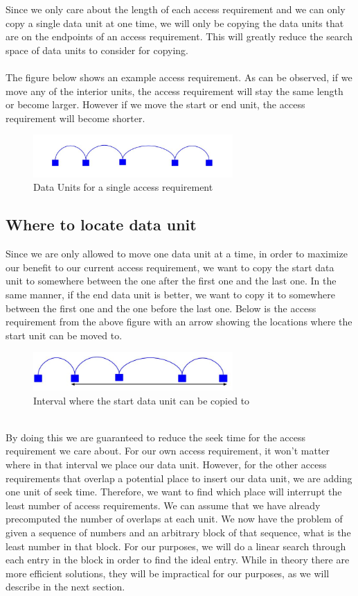 \documentclass[conference]{acmsiggraph}
\begin{document}
Since we only care about the length of each access requirement and we can only copy a single data unit at one time, we will only be copying the data units that are on the endpoints of an access requirement. This will greatly reduce the search space of data units to consider for copying. \\
\\
The figure below shows an example access requirement. As can be observed, if we move any of the interior units, the access requirement will stay the same length or become larger. However if we move the start or end unit, the access requirement will become shorter. 
\begin{figure}[ht]
\centering
\includegraphics[width=3in]{SingleAR_start.jpg}
\caption{Data Units for a single access requirement}
\end{figure}

\subsection{Where to locate data unit}

Since we are only allowed to move one data unit at a time, in order to maximize our benefit to our current access requirement, we want to copy the start data unit to somewhere between the one after the first one and the last one. In the same manner, if the end data unit is better, we want to copy it to somewhere between the first one and the one before the last one. Below is the access requirement from the above figure with an arrow showing the locations where the start unit can be moved to. \\
\begin{figure}[ht]
\centering
\includegraphics[width=3in]{SingleAR_afterCopy1.jpg}
\caption{Interval where the start data unit can be copied to}
\end{figure}
\\
By doing this we are guaranteed to reduce the seek time for the access requirement we care about. For our own access requirement, it won't matter where in that interval we place our data unit. However, for the other access requirements that overlap a potential place to insert our data unit, we are adding one unit of seek time. Therefore, we want to find which place will interrupt the least number of access requirements. We can assume that we have already precomputed the number of overlaps at each unit. We now have the problem of given a sequence of numbers and an arbitrary block of that sequence, what is the least number in that block. For our purposes, we will do a linear search through each entry in the block in order to find the ideal entry. While in theory there are more efficient solutions, they will be impractical for our purposes, as we will describe in the next section.
\end{document}
